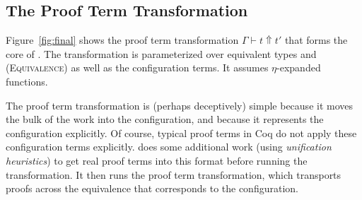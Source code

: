 \subsection{The Proof Term Transformation}
\label{sec:generic}

Figure~\ref{fig:final} shows the proof term transformation $\Gamma \vdash t \Uparrow t'$ that forms the core of \toolname.
The transformation is parameterized over equivalent types \A and \B (\textsc{Equivalence})
as well as the configuration terms. %
It assumes $\eta$-expanded functions.

The proof term transformation is (perhaps deceptively) simple because it moves the bulk of the work into the configuration,
and because it represents the configuration explicitly.
Of course, typical proof terms in Coq do not apply these configuration
terms explicitly.
\toolname does some additional work (using \textit{unification heuristics}) to get real proof terms into this format before running the transformation.
It then runs the proof term transformation, which transports proofs across the equivalence that corresponds to the configuration.

